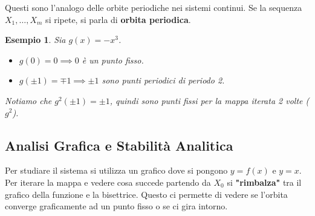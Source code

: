 \documentclass[openany]{book}
\newtheorem*{esempio}{Esempio}
\theoremstyle{definition}
\theoremstyle{remark}
\begin{document}
Questi sono l'analogo delle orbite periodiche nei sistemi continui. Se la sequenza $X_1, \dots, X_m$ si ripete, si parla di \textbf{orbita periodica}.

\begin{esempio}
    Sia $g(x) = -x^3$.
    \begin{itemize}
        \item $g(0) = 0 \implies 0$ è un punto fisso.
        \item $g(\pm 1) = \mp 1 \implies \pm 1$ sono punti periodici di periodo 2.
    \end{itemize}
    Notiamo che $g^2(\pm 1) = \pm 1$, quindi sono punti fissi per la mappa iterata 2 volte ($g^2$).
\end{esempio}

\subsection{Analisi Grafica e Stabilità Analitica}

Per studiare il sistema si utilizza un grafico dove si pongono $y = f(x)$ e $y = x$.
Per iterare la mappa e vedere cosa succede partendo da $X_0$ si \textbf{"rimbalza"} tra il grafico della funzione e la bisettrice. Questo ci permette di vedere se l'orbita converge graficamente ad un punto fisso o se ci gira intorno.
\end{document}
